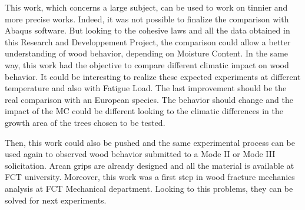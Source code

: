 This work, which concerns a large subject, can be used to work on tinnier and more precise works. Indeed, it was not possible to finalize the comparison with Abaqus software. But looking to the cohesive laws and all the data obtained in this Research and Developpement Project, the comparison could allow a better understanding of wood behavior, depending on Moisture Content. In the same way, this work had the objective to compare different climatic impact on wood behavior. It could be interesting to realize these expected experiments at different temperature and also with Fatigue Load. The last improvement should be the real comparison with an European species. The behavior should change and the impact of the MC could be different looking to the climatic differences in the growth area of the trees chosen to be tested. 

Then, this work could also be pushed and the same experimental process can be used again to observed wood behavior submitted to a Mode II or Mode III solicitation. Arcan grips are already designed and all the material is available at FCT university. Moreover, this work was a first step in wood fracture mechanics analysis at FCT Mechanical department. Looking to this problems, they can be solved for next experiments.

